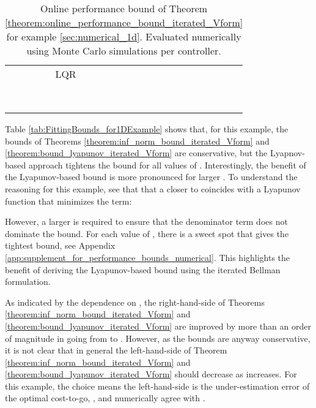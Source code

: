 \documentclass[journal]{IEEEtran}
\begin{document}
\begin{table} [h]
	\centering
	\caption{Online performance bound of Theorem \ref{theorem:online_performance_bound_iterated_Vform} for example \ref{sec:numerical_1d}. Evaluated numerically using  Monte Carlo simulations per controller.}
	\begin{tabular}{|c c|c c c|}
		\hline
		
		& 
		&  
		& 
		& 
		\\
		\hline
		\multicolumn{2}{|c|}{LQR}
		& 
		& 
		& 
		\\
 & 
		& 
		& 
		& 
		\\
 & 
		& 
		& 
		& 
		\\
 & 
		& 
		& 
		& 
		\\
 & 
		& 
		& 
		& 
		\\
 & 
		& 
		& 
		& 
		\\
 & 
		& 
		& 
		& 
		\\
 & 
		& 
		& 
		& 
		\\
 & 
		& 
		& 
		& 
		\\
		\hline
	\end{tabular}
	\label{tab:OnlineBounds_for1DExample}
\end{table}


Table \ref{tab:FittingBounds_for1DExample} shows that, for this example, the bounds of Theorems \ref{theorem:inf_norm_bound_iterated_Vform} and \ref{theorem:bound_lyapunov_iterated_Vform} are conservative, but the Lyapnov-based approach tightens the bound for all values of . Interestingly, the benefit of the Lyapunov-based bound is more pronounced for larger .
To understand the reasoning for this example, see that that a  closer to  coincides with a Lyapunov function that minimizes the term:
	
However, a larger  is required to ensure that the denominator term  does not dominate the bound. For each value of , there is a sweet spot that gives the tightest bound, see Appendix \ref{app:supplement_for_performance_bounds_numerical}. This highlights the benefit of deriving the Lyapunov-based bound using the iterated Bellman formulation.


As indicated by the dependence on , the right-hand-side of Theorems \ref{theorem:inf_norm_bound_iterated_Vform} and \ref{theorem:bound_lyapunov_iterated_Vform} are improved by more than an order of magnitude in going from  to . However, as the bounds are anyway conservative, it is not clear that in general the left-hand-side of Theorem \ref{theorem:inf_norm_bound_iterated_Vform} and \ref{theorem:bound_lyapunov_iterated_Vform} should decrease as  increases.
For this example, the choice  means the left-hand-side is the under-estimation error of the optimal cost-to-go, , and numerically agree with \cite{boyd_iteratedBellman}.
\end{document}
